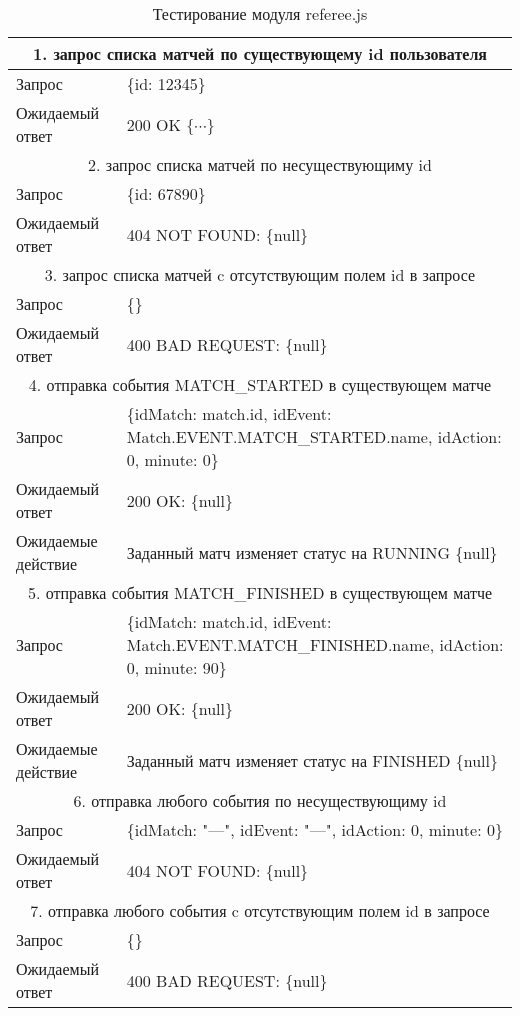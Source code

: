 \begin{table}[h] 
\caption{\label{tab:vuserjs}Тестирование модуля referee.js}
\begin{center}
\begin{tabular}{|l|p{10cm}|}

\hline
\multicolumn{2}{|c|}{1. запрос списка матчей по существующему id пользователя} \\
\hline
Запрос & \{id: 12345\} \\
Ожидаемый ответ & 200 OK $\{\cdots\}$ \\
\hline

\multicolumn{2}{|c|}{2. запрос списка матчей по несуществующиму id} \\
\hline
Запрос & \{id: 67890\} \\
Ожидаемый ответ & 404 NOT FOUND: \{null\} \\
\hline

\multicolumn{2}{|c|}{3. запрос списка матчей c отсутствующим полем id в запросе} \\
\hline
Запрос & \{\} \\
Ожидаемый ответ & 400 BAD REQUEST: \{null\} \\
\hline

\multicolumn{2}{|c|}{4. отправка события MATCH\_STARTED в существующем матче} \\
\hline
Запрос & \{idMatch: match.id,
                idEvent: Match.EVENT.MATCH\_STARTED.name,
                idAction: 0,
                minute: 0\} \\
Ожидаемый ответ & 200 OK: \{null\} \\
Ожидаемые действие & Заданный матч изменяет статус на RUNNING \{null\} \\
\hline

\multicolumn{2}{|c|}{5. отправка события MATCH\_FINISHED в существующем матче} \\
\hline
Запрос & \{idMatch: match.id,
                idEvent: Match.EVENT.MATCH\_FINISHED.name,
                idAction: 0,
                minute: 90\} \\
Ожидаемый ответ & 200 OK: \{null\} \\
Ожидаемые действие & Заданный матч изменяет статус на FINISHED \{null\} \\
\hline


\multicolumn{2}{|c|}{6. отправка любого события по несуществующиму id} \\
\hline
Запрос & \{idMatch: "---",
                idEvent: "---",
                idAction: 0,
                minute: 0\} \\
Ожидаемый ответ & 404 NOT FOUND: \{null\} \\
\hline

\multicolumn{2}{|c|}{7. отправка любого события c отсутствующим полем id в запросе} \\
\hline
Запрос & \{\} \\
Ожидаемый ответ & 400 BAD REQUEST: \{null\} \\
\hline

\end{tabular}
\end{center}
\end{table} 